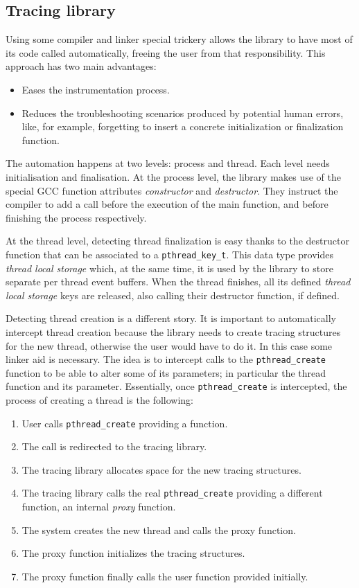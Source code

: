 \subsection{Tracing library}

Using some compiler and linker special trickery allows the library to have most
of its code called automatically, freeing the user from that responsibility.
This approach has two main advantages:

\begin{itemize}
\item Eases the instrumentation process.
\item Reduces the troubleshooting scenarios produced by potential human errors,
like, for example, forgetting to insert a concrete initialization or
finalization function.
\end{itemize}

The automation happens at two levels: process and thread.  Each level needs
initialisation and finalisation.  At the process level, the library makes use of
the special GCC function attributes \emph{constructor} and \emph{destructor}.
They instruct the compiler to add a call before the execution of the main
function, and before finishing the process respectively.

At the thread level, detecting thread finalization is easy thanks to the
destructor function that can be associated to a \verb:pthread_key_t:.  This data
type provides \emph{thread local storage} which, at the same time, it is used by
the library to store separate per thread event buffers.  When the thread
finishes, all its defined \emph{thread local storage} keys are released, also
calling their destructor function, if defined.

Detecting thread creation is a different story.  It is important to
automatically intercept thread creation because the library needs to create
tracing structures for the new thread, otherwise the user would have to do it.
In this case some linker aid is necessary.  The idea is to intercept calls to
the \verb:pthread_create: function to be able to alter some of its parameters;
in particular the thread function and its parameter.  Essentially, once
\verb:pthread_create: is intercepted, the process of creating a thread is the
following:

\begin{enumerate}
\item User calls \verb:pthread_create: providing a function.
\item The call is redirected to the tracing library.
\item The tracing library allocates space for the new tracing structures.
\item The tracing library calls the real \verb:pthread_create: providing a
different function, an internal \emph{proxy} function.
\item The system creates the new thread and calls the proxy function.
\item The proxy function initializes the tracing structures.
\item The proxy function finally calls the user function provided initially.
\end{enumerate}

